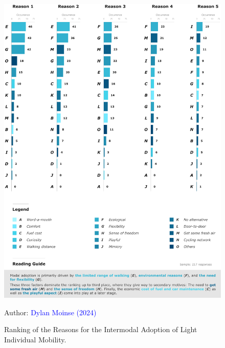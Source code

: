 \begin{refsegment}
\begin{figure}[h!]\vspace*{4pt}
    \caption{Ranking of the Reasons for the Intermodal Adoption of Light Individual Mobility.}
    \label{fig-chap4:classement-global-raisons}
    \centerline{\includegraphics[width=1\columnwidth]{src/Figures/Chap-4/EN_Raisons_adoption.pdf}}
    \vspace{5pt}
    \begin{flushright}\scriptsize{
    Author: \textcolor{blue}{Dylan Moinse (2024)}
    }\end{flushright}
\end{figure}


\end{refsegment}
